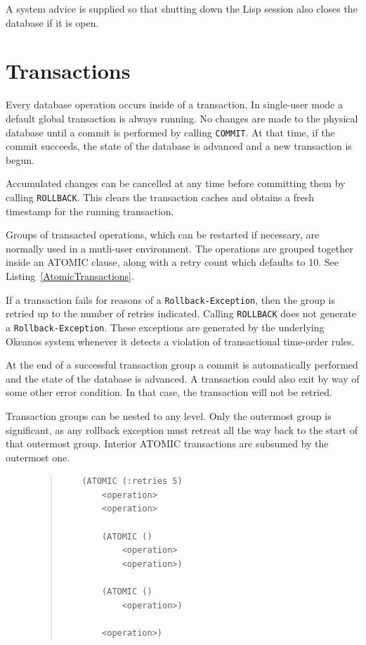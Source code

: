 \documentclass[article,oneside]{memoir}
\begin{document}
A system advice is supplied so that shutting down the Lisp session also closes the database if it is open.

\section{Transactions}
\label{Transactions}
Every database operation occurs inside of a transaction. In single-user mode a default global transaction is always running. No changes are made to the physical database until a commit is performed by calling \texttt{COMMIT}. At that time, if the commit succeeds, the state of the database is advanced and a new transaction is begun. 

Accumulated changes can be cancelled at any time before committing them by calling \texttt{ROLLBACK}. This clears the transaction caches and obtains a fresh timestamp for the running transaction.

Groups of transacted operations, which can be restarted if necessary, are normally used in a mutli-user environment. The operations are grouped together inside an {\ttfamily ATOMIC} clause, along with a retry count which defaults to 10. See Listing~\ref{AtomicTransactions}. 

If a transaction fails for reasons of a \texttt{Rollback-Exception}, then the group is retried up to the number of retries indicated. Calling \texttt{ROLLBACK} does not generate a \texttt{Rollback-Exception}. These exceptions are generated by the underlying Okeanos system whenever it detects a violation of transactional time-order rules.

At the end of a successful transaction group a commit is automatically performed and the state of the database is advanced. A transaction could also exit by way of some other error condition. In that case, the transaction will not be retried.

Transaction groups can be nested to any level. Only the outermost group is significant, as any rollback exception must retreat all the way back to the start of that outermost group. Interior {\ttfamily ATOMIC} transactions are subsumed by the outermost one.


\begin{figure}[!htbp]
\begin{quote}
\lstset{language=Lisp,caption=Atomic Transactions,label=AtomicTransactions}
\begin{lstlisting}
	(ATOMIC (:retries 5)
		<operation>
		<operation>
		
		(ATOMIC ()
			<operation>
			<operation>)
			
		(ATOMIC ()
			<operation>)
			
		<operation>)
\end{lstlisting}
\end{quote}
\end{figure}
\end{document}
